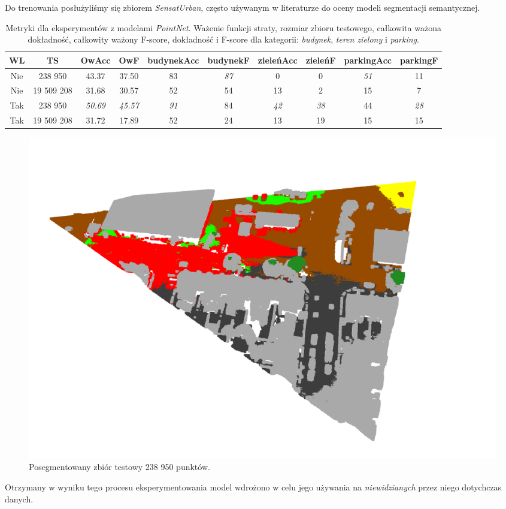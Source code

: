 Do trenowania posłużyliśmy się zbiorem \textit{SensatUrban}\cite{hu2022sensaturban}, często używanym w literaturze do oceny modeli segmentacji semantycznej.

\begin{table}[!h]
    \centering
    \begin{tabular}{|c|c|c|c|c|c|c|c|c|c|}
    \hline
    WL & TS & OwAcc & OwF & budynekAcc & budynekF & zieleńAcc & zieleńF & parkingAcc & parkingF \\
    \hline 
    Nie & 238 950 & 43.37 & 37.50 & 83 & \emph{87} & 0 & 0 & \emph{51} & 11 \\
    \hline 
    Nie & 19 509 208 & 31.68 & 30.57 & 52 & 54 & 13 & 2 & 15 & 7 \\
    \hline 
    Tak & 238 950 & \emph{50.69} & \emph{45.57} & \emph{91} & 84 & \emph{42} & \emph{38} & 44 & \emph{28} \\
    \hline
    Tak & 19 509 208 & 31.72 & 17.89 & 52 & 24 & 13 & 19 & 15 & 15 \\
    \hline
    \end{tabular}
\caption{Metryki dla eksperymentów z modelami \textit{PointNet}. Ważenie funkcji straty, rozmiar zbioru testowego, całkowita ważona dokładność, całkowity ważony F-score, dokładność i F-score dla kategorii: \textit{budynek}, \textit{teren zielony} i \textit{parking}.}
\label{table:tab_seg_met}
\end{table}

\begin{figure}[!h]
    \centering
    \includegraphics[width=1.0\linewidth]{images/segmented_birmingham.png}
    \caption{Posegmentowany zbiór testowy 238 950 punktów.}
    \label{fig:seg_bir}
\end{figure}

Otrzymany w wyniku tego procesu eksperymentowania model wdrożono w celu jego używania na \textit{niewidzianych} przez niego dotychczas danych.